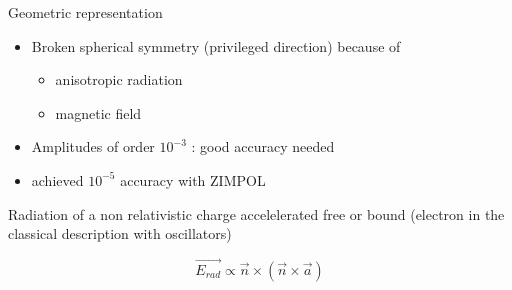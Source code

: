 \documentclass{beamer}
\begin{document}
\newcommand{\tikzAngleOfLine}{\tikz@AngleOfLine}
  \def\tikz@AngleOfLine(#1)(#2)#3{%
  \pgfmathanglebetweenpoints{%
    \pgfpointanchor{#1}{center}}{%
    \pgfpointanchor{#2}{center}}
  \pgfmathsetmacro{#3}{\pgfmathresult}%
  }



\begin{frame}{Geometric representation}

\begin{itemize}
\item Broken spherical symmetry (privileged direction) because of

\begin{itemize}
\item anisotropic radiation 

\item magnetic field

\end{itemize}

\item Amplitudes of order $10^{-3}$ : good accuracy needed

\item achieved $10^{-5}$ accuracy with ZIMPOL
\end{itemize}

Radiation of a non relativistic charge accelelerated free or bound 
(electron in the classical description with oscillators) 


\begin{equation}
	\vec{E_{rad}} \propto  \vec{n} \times (\vec{n} \times \vec{a}) 
\end{equation}



\end{frame}
\end{document}
